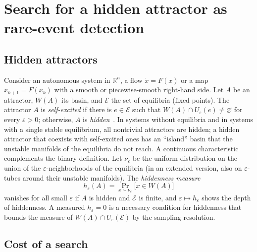 \section{Search for a hidden attractor as rare-event detection}\label{sec:problem}

\subsection{Hidden attractors}\label{sec:hidden}

Consider an autonomous system in $\mathbb{R}^n$, a flow $\dot x=F(x)$ or a map $x_{k+1}=F(x_k)$ with a smooth or piecewise-smooth right-hand side. Let $A$ be an attractor, $W(A)$ its basin, and $\mathcal{E}$ the set of equilibria (fixed points). The attractor $A$ is \emph{self-excited} if there is $e\in\mathcal{E}$ such that $W(A)\cap U_\varepsilon(e)\neq\varnothing$ for every $\varepsilon>0$; otherwise, $A$ is \emph{hidden}~\cite{LeonovKuznetsov2013}. In systems without equilibria and in systems with a single stable equilibrium, all nontrivial attractors are hidden; a hidden attractor that coexists with self-excited ones has an ``island'' basin that the unstable manifolds of the equilibria do not reach. A continuous characteristic complements the binary definition. Let $\nu_\varepsilon$ be the uniform distribution on the union of the $\varepsilon$-neighborhoods of the equilibria (in an extended version, also on $\varepsilon$-tubes around their unstable manifolds). The \emph{hiddenness measure}
\begin{equation}
h_\varepsilon(A)=\Pr_{x\sim\nu_\varepsilon}\bigl[x\in W(A)\bigr]
\label{eq:heps}
\end{equation}
vanishes for all small $\varepsilon$ if $A$ is hidden and $\mathcal E$ is finite, and $\varepsilon\mapsto h_\varepsilon$ shows the depth of hiddenness. A measured $h_\varepsilon=0$ is a necessary condition for hiddenness that bounds the measure of $W(A)\cap U_\varepsilon(\mathcal E)$ by the sampling resolution.

\subsection{Cost of a search}\label{sec:rare}

